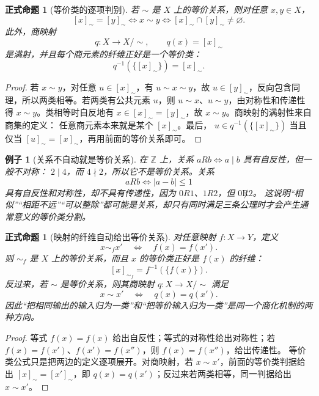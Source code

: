 \documentclass[UTF8,fontset=none,a4paper,11pt]{ctexart}
\theoremstyle{foundation-definition}
\theoremstyle{foundation-theorem}
\theoremstyle{foundation-proposition}
\newtheorem{proposition}[definition]{正式命题}
\theoremstyle{foundation-example}
\newtheorem{example}[definition]{例子}
\theoremstyle{foundation-remark}
\theoremstyle{foundation-theorem}
\begin{document}
\begin{proposition}[等价类的逐项判别]\label{prop:equivalence-class-basic}
若 \(\sim\) 是 \(X\) 上的等价关系，则对任意 \(x,y\in X\)，
\[
[x]_\sim=[y]_\sim
\Longleftrightarrow x\sim y
\Longleftrightarrow [x]_\sim\cap[y]_\sim\ne\varnothing.
\]
此外，商映射
\[
q:X\to X/{\sim},\qquad q(x)=[x]_\sim
\]
是满射，并且每个商元素的纤维正好是一个等价类：
\[
q^{-1}(\{[x]_\sim\})=[x]_\sim.
\]
\end{proposition}

\begin{proof}
若 \(x\sim y\)，对任意 \(u\in[x]_\sim\)，有 \(u\sim x\sim y\)，故
\(u\in[y]_\sim\)，反向包含同理，所以两类相等。若两类有公共元素 \(u\)，则
\(u\sim x\)、\(u\sim y\)，由对称性和传递性得 \(x\sim y\)。类相等时自反地有
\(x\in[x]_\sim=[y]_\sim\)，故 \(x\sim y\)。商映射的满射性来自商集的定义：
任意商元素本来就是某个 \([x]_\sim\)。最后，
\(u\in q^{-1}(\{[x]_\sim\})\) 当且仅当 \([u]_\sim=[x]_\sim\)，再用前面的等价关系即可。
\end{proof}

\begin{example}[关系不自动就是等价关系]
在 \(\mathbb Z\) 上，关系 \(aRb\Longleftrightarrow a\mid b\) 具有自反性，但一般不对称：
\(2\mid4\)，而 \(4\nmid2\)，所以它不是等价关系。关系
\[
aRb\Longleftrightarrow |a-b|\le1
\]
具有自反性和对称性，却不具有传递性，因为 \(0R1\)、\(1R2\)，但 \(0\not R2\)。
这说明“相似”“相距不远”“可以整除”都可能是关系，却只有同时满足三条公理时才会产生通常意义的等价类分割。
\end{example}

\begin{proposition}[映射的纤维自动给出等价关系]\label{prop:fibers-equivalence}
对任意映射 \(f:X\to Y\)，定义
\[
x\sim_f x'\quad\Longleftrightarrow\quad f(x)=f(x').
\]
则 \(\sim_f\) 是 \(X\) 上的等价关系，而且 \(x\) 的等价类正好是 \(f(x)\) 的纤维：
\[
[x]_{\sim_f}=f^{-1}(\{f(x)\}).
\]
反过来，若 \(\sim\) 是等价关系，则其商映射 \(q:X\to X/{\sim}\) 满足
\[
x\sim x'\quad\Longleftrightarrow\quad q(x)=q(x').
\]
因此“把相同输出的输入归为一类”和“把等价输入归为一类”是同一个商化机制的两种方向。
\end{proposition}

\begin{proof}
等式 \(f(x)=f(x)\) 给出自反性；等式的对称性给出对称性；若
\(f(x)=f(x')\)、\(f(x')=f(x'')\)，则 \(f(x)=f(x'')\)，给出传递性。
等价类公式只是把两边的定义逐项展开。对商映射，若 \(x\sim x'\)，前面的等价类判据给出
\([x]_\sim=[x']_\sim\)，即 \(q(x)=q(x')\)；反过来若两类相等，同一判据给出 \(x\sim x'\)。
\end{proof}
\end{document}
